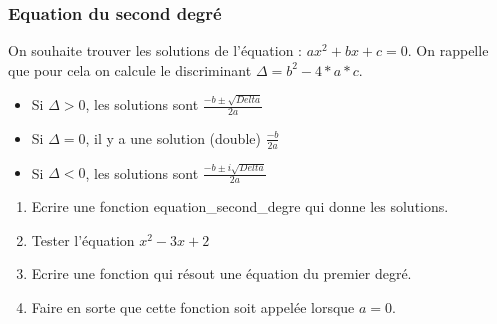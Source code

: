 \documentclass[letterpaper,10pt,english]{sphinxhowto}
\begin{document}
\subsubsection{Equation du second degré}
\label{\detokenize{cours1_fonctions_corr_exercices:equation-du-second-degre}}
\sphinxAtStartPar
On souhaite trouver les solutions de l’équation : \(ax^2 + bx + c=0\). On rappelle que pour cela on calcule le discriminant \(\Delta = b^2 - 4*a*c\).
\begin{itemize}
\item {} 
\sphinxAtStartPar
Si \(\Delta>0\), les solutions sont \(\frac{-b \pm \sqrt{Delta}}{2a}\)

\item {} 
\sphinxAtStartPar
Si \(\Delta=0\), il y a une solution (double) \(\frac{-b }{2a}\)

\item {} 
\sphinxAtStartPar
Si \(\Delta<0\), les solutions sont \(\frac{-b \pm i\sqrt{Delta}}{2a}\)

\end{itemize}
\begin{enumerate}
%
\item {} 
\sphinxAtStartPar
Ecrire une fonction equation\_second\_degre qui donne les solutions.

\item {} 
\sphinxAtStartPar
Tester l’équation \(x^2 -3x + 2\)

\item {} 
\sphinxAtStartPar
Ecrire une fonction qui résout une équation du premier degré.

\item {} 
\sphinxAtStartPar
Faire en sorte que cette fonction soit appelée lorsque \(a=0\).

\end{enumerate}
\end{document}
